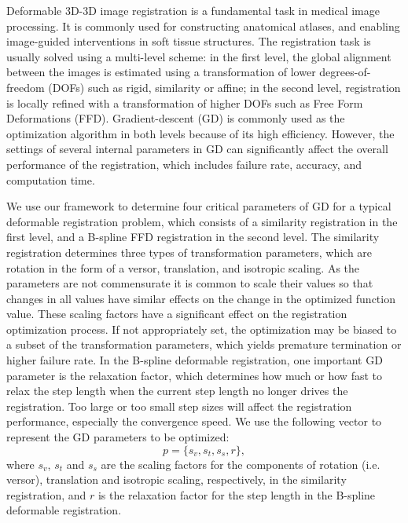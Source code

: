 \documentclass[]{spie}  %
\begin{document}
Deformable 3D-3D image registration is a fundamental task in medical image processing. It is commonly used for constructing anatomical atlases, and enabling image-guided interventions in soft tissue structures. The registration task is usually solved using a multi-level scheme: in the first level, the global alignment between the images is estimated using a transformation of lower degrees-of-freedom (DOFs) such as rigid, similarity or affine; in the second level, registration is locally refined with a transformation of higher DOFs such as Free Form Deformations (FFD). Gradient-descent (GD) is commonly used as the optimization algorithm in both levels because of its high efficiency. However, the settings of several internal parameters in GD can significantly affect the overall performance of the registration, which includes failure rate, accuracy, and computation time.

We use our framework to determine four critical parameters of GD for a typical deformable registration problem, which consists of a similarity registration in the first level, and a B-spline FFD registration in the second level. 
The similarity registration determines three types of transformation parameters, which are rotation in the form of a versor, translation, and isotropic scaling. As the parameters are not commensurate it is common to scale their values so that changes in all values have similar effects on the change in the optimized function value. These scaling factors have a significant effect on the registration optimization process. If not appropriately set, the optimization may be biased to a subset of the transformation parameters, which yields premature termination or higher failure rate. 
In the B-spline deformable registration, one important GD parameter is the relaxation factor, which determines how much or how fast to relax the step length when the current step length no longer drives the registration. Too large or too small step sizes will affect the registration performance, especially the convergence speed. 
We use the following vector to represent the GD parameters to be optimized:
\begin{equation}
p = \{s_{v},s_{t},s_{s},r\},
\end{equation}
where $s_{v}$, $s_{t}$ and $s_{s}$ are the scaling factors for the components of rotation (i.e. versor), translation and isotropic scaling, respectively, in the similarity registration, and $r$ is the relaxation factor for the step length in the B-spline deformable registration. 
\end{document}
